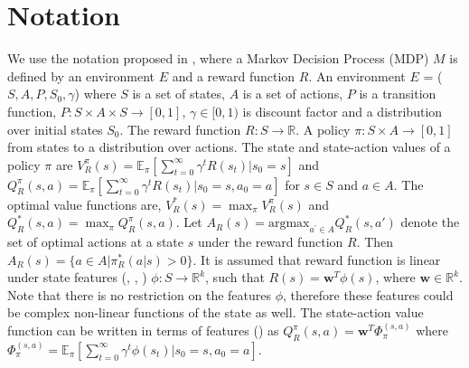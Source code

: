 \section{Notation}
\label{sec:notation}
We use the notation proposed in \cite{amin2017repeated}, where a Markov Decision Process (MDP) $M$ is defined by an environment $E$ and a reward function $R$. An environment $E$ = ($S, A, P, S_0, \gamma$) where $S$ is a set of states, $A$ is a set of actions, $P$ is a transition function, $P : S  \times A \times S \rightarrow [0,1]$, $\gamma \in [0,1)$ is discount factor and a distribution over initial states $S_0$. The reward function $R: S \rightarrow \mathbb{R}$. A policy $\pi: S \times A \rightarrow [0,1]$ from states to a distribution over actions. The state and state-action values of a policy $\pi$ are $V_R^{\pi}(s) = \mathbb{E}_{\pi}[\sum_{t=0}^{\infty} \gamma^t R(s_t) | s_0 = s]$ and $Q_R^{\pi}(s,a) = \mathbb{E}_{\pi}[\sum_{t=0}^{\infty} \gamma^t R(s_t) | s_0 = s, a_0 = a]$ for $s \in S$ and $a \in A$. The optimal value functions are, $V^*_R(s) = \max_{\pi}V_R^{\pi}(s)$ and $Q^*_R(s,a) = \max_{\pi}Q_R^{\pi}(s,a)$. Let $A_R(s) = {\mathrm{argmax}}_{a^{'} \in A}Q^*_R(s,a')$ denote the set of optimal actions at a state $s$ under the reward function $R$. Then $A_R(s) = \{ a \in A | {\pi}^*_R(a|s) > 0 \}$. It is assumed that reward function is linear under state features (\cite{ziebart2008maximum}, \cite{barreto2016successor}, \cite{brown2020safe}) $\phi: S \rightarrow \mathbb{R}^k$, such that $R(s) = \mathbf{w}^T\phi(s)$, where $\mathbf{w} \in \mathbb{R}^k$. Note that there is no restriction on the features $\phi$, therefore these features could be complex non-linear functions of the state as well. The state-action value function can be written in terms of features (\cite{abbeel2004apprenticeship}) as $Q_R^{\pi}(s,a) = \mathbf{w}^{T} \Phi_{\pi}^{(s,a)}$ where $\Phi_{\pi}^{(s,a)} = \mathbb{E}_{\pi}[\sum_{t=0}^{\infty} \gamma^t \phi(s_t) | s_0 = s, a_0 = a]$.


